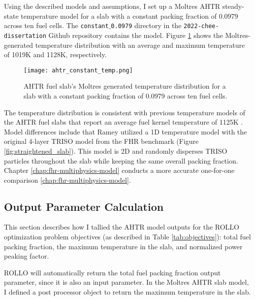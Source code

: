 Using the described models and assumptions, I set up a Moltres AHTR steady-state 
temperature model for a slab with a constant packing fraction of 0.0979 across ten 
fuel cells. 
The \texttt{constant$\_$0.0979} directory in the \texttt{2022-chee-dissertation} 
Github repository contains the model. %
Figure \ref{fig:ahtr_constant_temp} shows the Moltres-generated temperature 
distribution with an average and maximum temperature of 1019K and 1128K, 
respectively.
\begin{figure}[H]
    \centering
    \texttt{[image: ahtr\_constant\_temp.png]}
    \caption{AHTR fuel slab's Moltres generated temperature distribution for a 
    slab with a constant packing fraction of 0.0979 across ten fuel cells.}  
    \label{fig:ahtr_constant_temp}
\end{figure}
The temperature distribution is consistent with previous temperature models of 
the AHTR fuel slabs that report an average fuel kernel temperature of 1125K 
\cite{ramey_methodology_2021}. 
Model differences include that Ramey \cite{ramey_methodology_2021} utilized a 
1D temperature model with the original 4-layer TRISO model from the FHR benchmark 
(Figure \ref{fig:straightened_slab}).
This model is 2D and randomly disperses TRISO particles throughout the 
slab while keeping the same overall packing fraction. 
Chapter \ref{chap:fhr-multiphysics-model} conducts a more accurate one-for-one 
comparison \ref{chap:fhr-multiphysics-model}.

\subsection{Output Parameter Calculation}
\label{sec:ahtr_slab_output}
This section describes how I tallied the AHTR model outputs for the ROLLO 
optimization problem objectives (as described in Table \ref{tab:objectives}):
total fuel packing fraction, the maximum temperature in the slab, and 
normalized power peaking factor.  

ROLLO will automatically return the total fuel packing fraction output parameter, 
since it is also an input parameter. 
In the Moltres AHTR slab model, I defined a post processor object to return the 
maximum temperature in the slab. 

